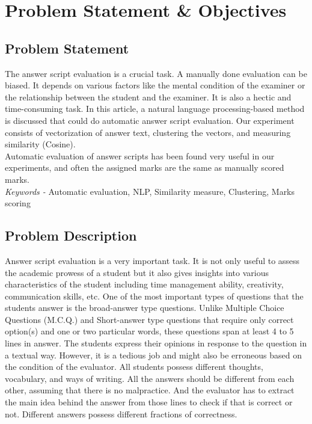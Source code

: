 \chapter{Problem Statement \& Objectives}

\section{Problem Statement}
\par
The answer script evaluation is a crucial task. A manually done evaluation can be biased. It depends on various factors like the mental condition of the examiner or the relationship between the student and the examiner. It is also a hectic and time-consuming task. In this article, a natural language processing-based method is discussed that could do automatic answer script evaluation. Our experiment consists of vectorization of answer text, clustering the vectors, and measuring similarity (Cosine). \\
Automatic evaluation of answer scripts has been found very useful in our experiments, and often the assigned marks are the same as manually scored marks. \\
\textit{Keywords -}  Automatic evaluation, NLP, Similarity measure, Clustering, Marks scoring

\section{Problem Description}
Answer script evaluation is a very important task. It is not only useful to assess the academic prowess of a student but it also gives insights into various characteristics of the student including time management ability, creativity, communication skills, etc. One of the most important types of questions that the students answer is the broad-answer type questions. Unlike Multiple Choice Questions (M.C.Q.) and Short-answer type questions that require only correct option(s) and one or two particular words, these questions span at least 4 to 5 lines in answer. The students express their opinions in response to the question in a textual way. However, it is a tedious job and might also be erroneous based on the condition of the evaluator. All students possess different thoughts, vocabulary, and ways of writing. All the answers should be different from each other, assuming that there is no malpractice. And the evaluator has to extract the main idea behind the answer from those lines to check if that is correct or not. Different answers possess different fractions of correctness. \\


